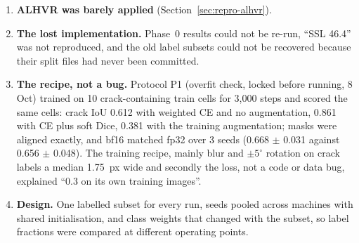 \begin{enumerate}
    Mean Teacher checkpoint: 100\% of unlabelled pixels had two or more ``positive'' classes (background on 98.9\%, crack on 20.3\%
    against a true share of about 0.19\%). The gradient was real (0.25 $\pm$ 0.35 of the supervised gradient) but nearly orthogonal to
    it (cosine 0.07). Every Mean Teacher result of the period, on both datasets, tested this loss, not Mean Teacher. P2 also found that a
    correct confidence rule (maximum probability $\geq 0.95$) would give crack 0.024\% of the confident pixels, about 8$\times$ under
    its labelled share: the rare-class problem of pseudo-labels, measured on our data.
  \item \textbf{ALHVR was barely applied} (Section~\ref{sec:repro-alhvr}).
  \item \textbf{The lost implementation.} Phase~0 results could not be re-run, ``SSL 46.4'' was not reproduced, and the old label
    subsets could not be recovered because their split files had never been committed.
  \item \textbf{The recipe, not a bug.} Protocol P1 (overfit check, locked before running, 8 Oct) trained on 10 crack-containing train
    cells for 3,000 steps and scored the same cells: crack IoU 0.612 with weighted CE and no augmentation, 0.861 with CE plus soft Dice,
    0.381 with the training augmentation; masks were aligned exactly, and bf16 matched fp32 over 3 seeds (0.668 $\pm$ 0.031 against
    0.656 $\pm$ 0.048). The training recipe, mainly blur and $\pm 5^\circ$ rotation on crack labels a median 1.75~px wide and
    secondly the loss, not a code or data bug, explained ``0.3 on its own training images''.
  \item \textbf{Design.} One labelled subset for every run, seeds pooled across machines with shared initialisation, and class weights
    that changed with the subset, so label fractions were compared at different operating points.
\end{enumerate}


